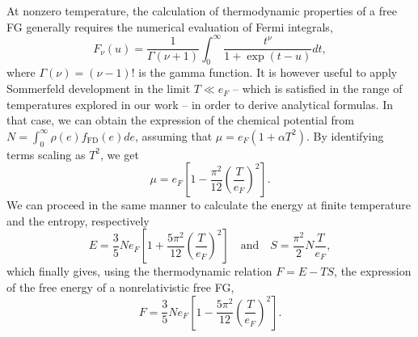 At nonzero temperature, the calculation of thermodynamic properties of a free
FG generally requires the numerical evaluation of Fermi integrals,
%
\begin{equation}
  F_\nu(u) = \frac{1}{\Gamma(\nu+1)}\int_0^\infty\frac{t^\nu}{1+\exp(t-u)}dt,
\end{equation}
%
where $\Gamma(\nu) = (\nu-1)!$ is the gamma function.
It is however useful to apply Sommerfeld development in the limit $T \ll
e_F$ -- which is satisfied in the range of temperatures explored in our work -- 
in order to derive analytical formulas. In that case, we can obtain the
expression of the chemical potential from $N=\int_0^\infty
\rho(e)f_{\text{FD}}(e)de$, assuming that $\mu=e_F(1+\alpha T^2)$. By
identifying terms scaling as $T^2$, we get
%
\begin{equation}
  \mu = e_F\left[1 - \frac{\pi^2}{12}\left(\frac{T}{e_F}\right)^2\right].
\end{equation}
%
We can proceed in the same manner to calculate the energy at finite
temperature and the entropy, respectively
%
\begin{equation}
  E = \frac{3}{5} N e_F 
  \left[1+\frac{5\pi^2}{12}\left(\frac{T}{e_F}\right)^2\right] \quad \text{and}
  \quad S = \frac{\pi^2}{2}N\frac{T}{e_F},
\end{equation}
%
which finally gives, using the thermodynamic relation $F=E-TS$, the expression
of the free energy of a nonrelativistic free FG,
%
\begin{equation}
  F = \frac{3}{5} N e_F
  \left[1-\frac{5\pi^2}{12}\left(\frac{T}{e_F}\right)^2\right].
\end{equation}
%

